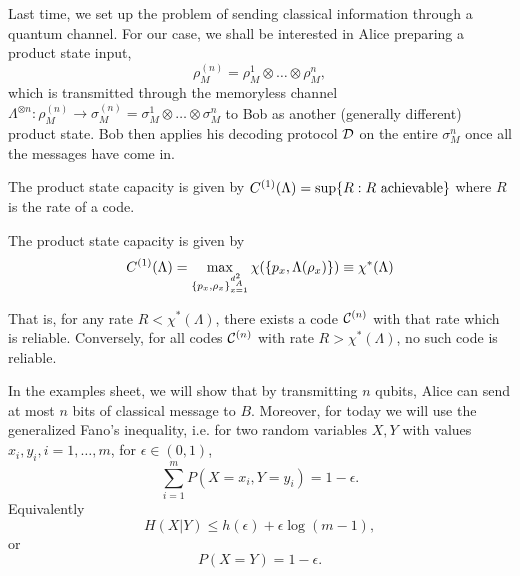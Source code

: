 Last time, we set up the problem of sending classical information through a quantum channel. For our case, we shall be interested in Alice preparing a product state input,
\begin{equation}
    \rho_M^{(n)}= \rho_M^1 \otimes \ldots \otimes \rho_M^n,
\end{equation}
which is transmitted through the memoryless channel $\Lambda^{\otimes n}: \rho^{(n)}_M \to \sigma_M^{(n)} = \sigma_M^1 \otimes \ldots \otimes \sigma_M^n$ to Bob as another (generally different) product state. Bob then applies his decoding protocol $\mathcal{D}$ on the entire $\sigma_M^n$ once all the messages have come in.

The product state capacity is given by $C^{(1)}(\Lambda)= \sup\{R: R\text{ achievable}\}$ where $R$ is the rate of a code.
\begin{thm}
    The product state capacity is given by
    \begin{equation}
        C^{(1)}(\Lambda)=\max_{\{p_x,\rho_x\}_{x=1}^{d_A^2}} \chi(\{p_x,\Lambda(\rho_x)\}) \equiv \chi^*(\Lambda)
    \end{equation}
\end{thm}
That is, for any rate $R< \chi^*(\Lambda)$, there exists a code $\mathcal{C}^{(n)}$ with that rate which is reliable. Conversely, for all codes $\mathcal{C}^{(n)}$ with rate $R >\chi^*(\Lambda)$, no such code is reliable.

In the examples sheet, we will show that by transmitting $n$ qubits, Alice can send at most $n$ bits of classical message to $B$. Moreover, for today we will use the generalized Fano's inequality, i.e. for two random variables $X,Y$ with values $x_i,y_i,i=1,\ldots,m$, for $\epsilon\in (0,1)$,
\begin{equation}
    \sum_{i=1}^m P(X=x_i,Y=y_i)=1-\epsilon.
\end{equation}
Equivalently
\begin{equation}
    H(X|Y)\leq h(\epsilon) + \epsilon \log(m-1),
\end{equation}
or
\begin{equation}
    P(X=Y)=1-\epsilon.
\end{equation}

